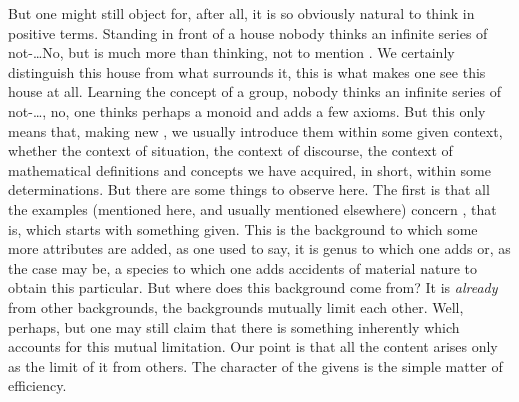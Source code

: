 \pa\label{pa:pragmaticPositive} But one might still object for, after
all, it is so obviously natural to think in positive terms. Standing in front of
a house nobody thinks an infinite series of not-\ldots No, but
 is much more than thinking, not to mention . We certainly distinguish this house from what surrounds it, this
is what makes one see this house at all. Learning the concept of a group, nobody
thinks an infinite series of not-\ldots, no, one thinks perhaps a monoid and
adds a few axioms. But this only means that, making new , we
usually introduce them within some given context, whether the context of
 situation, the context of discourse, the context of mathematical
definitions and concepts we have acquired, in short, within some 
determinations. But there are some things to observe here. The first is that all
the examples (mentioned here, and usually mentioned elsewhere) concern
, that is,  which starts with
something given. This  is the  background to
which some more  attributes are added, as one used to say, it is
genus to which one adds  or, as the case may be, a
species to which one adds accidents of material nature to obtain this
particular. But where does this  background come from? It is {\em
  already}  from other  backgrounds, the
 backgrounds mutually limit each other. Well, perhaps, but one may
still claim that there is something inherently  which accounts for
this mutual limitation. Our point is that all the  content arises
only as the limit of  it from others. The 
character of the givens is the simple matter of efficiency.

